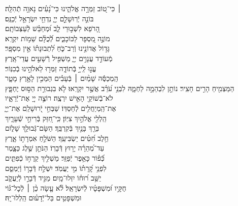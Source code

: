 \documentclass[twoside, openany, parskip=half, 11pt]{book}
\begin{document}
\begin{narrow}
 ׀ \hfill \break
כִּי־ט֭וֹב זַמְּרָ֣ה אֱלֹהֵ֑ינוּ \hfill כִּי־נָ֝עִ֗ים נָאוָ֥ה תְֿהִלָּֽה׃\\
בּוֹנֵ֣ה יְֿרֽוּשָׁלַ֣‍ִם יְיָ֑ \hfill נִדְחֵ֖י יִשְׂרָאֵ֣ל יְֿכַנֵּֽס׃\\
הָ֭רֹפֵא לִשְׁב֣וּרֵי לֵ֑ב \hfill וּ֝מְחַבֵּ֗שׁ לְֿעַצְּבוֹתָֽם׃\\
מוֹנֶ֣ה מִ֭סְפָּר לַכּוֹכָבִ֑ים \hfill לְֿ֝כֻלָּ֗ם שֵׁמ֥וֹת יִקְרָֽא׃\\
גָּד֣וֹל אֲדוֹנֵ֣ינוּ וְֿרַב־כֹּ֑חַ \hfill לִ֝תְבוּנָת֗וֹ אֵ֣ין מִסְפָּֽר׃ \\
מְֿעוֹדֵ֣ד עֲנָוִ֣ים יְיָ֑ \hfill מַשְׁפִּ֖יל רְֿשָׁעִ֣ים עֲדֵי־אָֽרֶץ׃\\
עֱנ֣וּ לַֽייָ֣ בְּֿתוֹדָ֑ה \hfill זַמְּר֖וּ לֵאלֹהֵ֣ינוּ בְֿכִנּֽוֹר׃\\
הַֽמְכַסֶּ֬ה שָׁמַ֨יִם ׀ בְּֿעָבִ֗ים \hfill הַמֵּכִ֣ין לָאָ֣רֶץ מָטָ֑ר\\ הַמַּצְמִ֖יחַ הָרִ֣ים חָצִֽיר׃ \hfill
נוֹתֵ֣ן לִבְהֵמָ֣ה לַחְמָ֑הּ לִבְנֵ֥י עֹ֝רֵ֗ב אֲשֶׁ֣ר יִקְרָֽאוּ׃ \hfill
לֹ֤א בִגְבוּרַ֣ת הַסּ֣וּס יֶחְפָּ֑ץ \\ לֹא־בְֿשׁוֹקֵ֖י הָאִ֣ישׁ יִרְצֶֽה׃ \hfill
רוֹצֶ֣ה יְיָ֭ אֶת־יְֿרֵאָ֑יו\\ אֶת־הַֽמְיַחֲלִ֥ים לְֿחַסְדּֽוֹ׃ \hfill
שַׁבְּחִ֣י יְֿ֭רוּשָׁלַ‍ִם אֶת־יְיָ֑\\ הַֽלְלִ֖י אֱלֹהַ֣יִךְ צִיּֽוֹן׃ \hfill
כִּֽי־חִ֭זַּק בְּֿרִיחֵ֣י שְֿׁעָרָ֑יִךְ\\ בֵּרַ֖ךְ בָּנַ֣יִךְ בְּֿקִרְבֵּֽךְ׃ \hfill
הַשָּׂם־גְּֿבוּלֵ֥ךְ שָׁל֑וֹם\\ חֵ֥לֶב חִ֝טִּ֗ים יַשְׂבִּיעֵֽךְ׃ \hfill
הַשֹּׁלֵ֣חַ אִמְרָת֣וֹ אָ֑רֶץ\\ עַד־מְ֝הֵרָ֗ה יָר֥וּץ דְּֿבָרֽוֹ׃ \hfill
הַנֹּתֵ֣ן שֶׁ֣לֶג כַּצָּ֑מֶר\\ כְּֿ֝פ֗וֹר כָּאֵ֥פֶר יְֿפַזֵּֽר׃ \hfill
מַשְׁלִ֣יךְ קַֽרְח֣וֹ כְֿפִתִּ֑ים\\ לִפְנֵ֥י קָ֝רָת֗וֹ מִ֣י יַעֲמֹֽד׃ \hfill
יִשְׁלַ֣ח דְּֿבָר֣וֹ וְֿיַמְסֵ֑ם\\ יַשֵּׁ֥ב ר֝וּח֗וֹ יִזְּלוּ־מָֽיִם׃ \hfill
מַגִּ֣יד דְּֿבָרָ֣ו לְֿיַעֲקֹ֑ב\\ חֻקָּ֥יו וּ֝מִשְׁפָּטָ֗יו לְֿיִשְׂרָאֵֽל׃ \hfill
לֹ֘א עָ֤שָׂה כֵ֨ן ׀ לְֿכׇל־גּ֗וֹי\\ וּמִשְׁפָּטִ֥ים בַּל־יְֿדָע֗וּם \hfill הַֽלְלוּ־יָֽהּ׃


\end{narrow}
\end{document}
